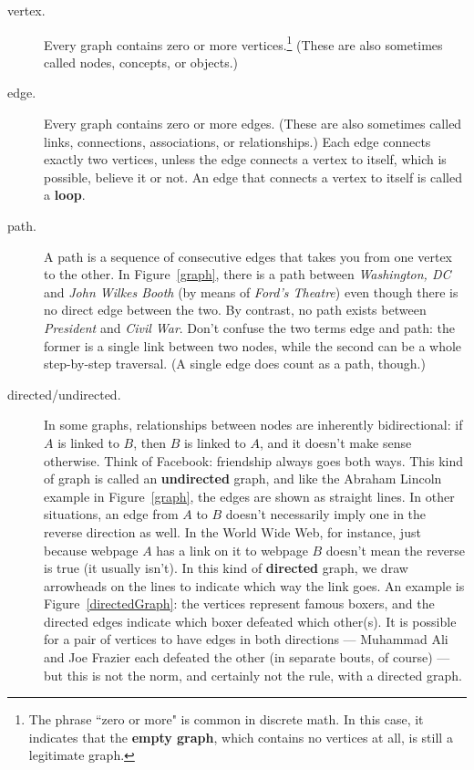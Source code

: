 \begin{description}

\item[vertex.] Every graph contains zero or more vertices.\footnote{The
phrase ``zero or more" is common in discrete math. In this case, it
indicates that the \textbf{empty graph}, which contains no vertices at all,
is still a legitimate graph.} (These are also sometimes called nodes,
concepts, or objects.)

\item[edge.] Every graph contains zero or more edges. (These are also
sometimes called links, connections, associations, or relationships.) Each
edge connects exactly two vertices, unless the edge connects a vertex to
itself, which is possible, believe it or not. An edge that connects a
vertex to itself is called a \textbf{loop}.

\item[path.] A path is a sequence of consecutive edges that takes you from
one vertex to the other. In Figure~\ref{graph}, there is a path between
\textsl{Washington, DC} and \textsl{John Wilkes Booth} (by means of
\textsl{Ford's Theatre}) even though there is no direct edge between the
two. By contrast, no path exists between \textsl{President} and
\textsl{Civil War}. Don't confuse the two terms edge and path: the former
is a single link between two nodes, while the second can be a whole
step-by-step traversal. (A single edge does count as a path, though.)

\item[directed/undirected.] In some graphs, relationships between nodes are
inherently bidirectional: if $A$ is linked to $B$, then $B$ is linked
to $A$, and it doesn't make sense otherwise. Think of Facebook: friendship
always goes both ways. This kind of graph is called an \textbf{undirected}
graph, and like the Abraham Lincoln example in Figure~\ref{graph}, the
edges are shown as straight lines. In other situations, an edge from $A$ to
$B$ doesn't necessarily imply one in the reverse direction as well. In the
World Wide Web, for instance, just because webpage $A$ has a link on it to
webpage $B$ doesn't mean the reverse is true (it usually isn't). In this
kind of \textbf{directed} graph, we draw arrowheads on the lines to
indicate which way the link goes. An example is Figure~\ref{directedGraph}:
the vertices represent famous boxers, and the directed edges indicate which
boxer defeated which other(s). It is possible for a pair of vertices to
have edges in both directions --- Muhammad Ali and Joe Frazier each
defeated the other (in separate bouts, of course) --- but this is not the
norm, and certainly not the rule, with a directed graph.


\end{description}
